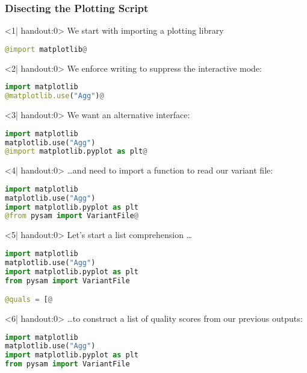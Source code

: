\setcounter{preframe_handson}{\value{handson}}
\begin{frame}[fragile]
  \frametitle{Disecting the Plotting Script}
  \setcounter{handson}{\value{preframe_handson}}

  \begin{onlyenv}<1| handout:0>
   We start with importing a plotting library
   \begin{lstlisting}[language=Python,style=Python]
@import matplotlib@
   \end{lstlisting}
  \end{onlyenv}
  \begin{onlyenv}<2| handout:0>
   We enforce writing to suppress the interactive mode:
   \begin{lstlisting}[language=Python,style=Python]
import matplotlib
@matplotlib.use("Agg")@
   \end{lstlisting}
  \end{onlyenv}
  \begin{onlyenv}<3| handout:0>
   We want an alternative interface:
   \begin{lstlisting}[language=Python,style=Python]
import matplotlib
matplotlib.use("Agg")
@import matplotlib.pyplot as plt@
   \end{lstlisting}
  \end{onlyenv}
  \begin{onlyenv}<4| handout:0>
   \ldots and need to import a function to read our variant file:
   \begin{lstlisting}[language=Python,style=Python]
import matplotlib
matplotlib.use("Agg")
import matplotlib.pyplot as plt
@from pysam import VariantFile@
   \end{lstlisting}
  \end{onlyenv}
  \begin{onlyenv}<5| handout:0>
   Let's start a list comprehension \ldots
   \begin{lstlisting}[language=Python,style=Python]
import matplotlib
matplotlib.use("Agg")
import matplotlib.pyplot as plt
from pysam import VariantFile

@quals = [@
   \end{lstlisting}
  \end{onlyenv}
   \begin{onlyenv}<6| handout:0>
   \ldots to construct a list of quality scores from our previous outputs:
   \begin{lstlisting}[language=Python,style=Python]
import matplotlib
matplotlib.use("Agg")
import matplotlib.pyplot as plt
from pysam import VariantFile


\end{lstlisting}
\end{onlyenv}
\end{frame}
